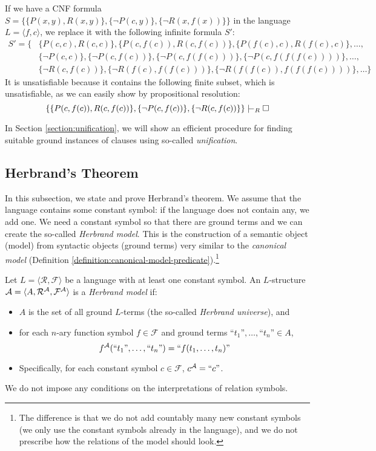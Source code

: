 \begin{example}
If we have a CNF formula $S=\{\{P(x,y),R(x,y)\},\{\neg P(c,y)\},\{\neg R(x,f(x))\}\}$ in the language $L=\langle f,c\rangle$, we replace it with the following infinite formula $S'$:
\begin{align*}
    S'=\{&\{P(c,c),R(c,c)\},\{P(c,f(c)),R(c,f(c))\},\{P(f(c),c),R(f(c),c)\},\dots,\\ 
    &\{\neg P(c,c)\}, \{\neg P(c,f(c))\},\{\neg P(c,f(f(c)))\},\{\neg P(c,f(f(f(c))))\}, \dots,\\
    &\{\neg R(c,f(c))\}, \{\neg R(f(c),f(f(c)))\},\{\neg R(f(f(c)),f(f(f(c))))\},\dots\}    
\end{align*}
It is unsatisfiable because it contains the following finite subset, which is unsatisfiable, as we can easily show by propositional resolution:
$$
\{\{P(c,f(c)),R(c,f(c))\},\{\neg P(c,f(c))\},\{\neg R(c,f(c))\}\}\proves_R\square
$$
\end{example}
In Section \ref{section:unification}, we will show an efficient procedure for finding suitable ground instances of clauses using so-called \emph{unification}.

\subsection{Herbrand's Theorem}

In this subsection, we state and prove Herbrand's theorem. We assume that the language contains some constant symbol: if the language does not contain any, we add one. We need a constant symbol so that there are ground terms and we can create the so-called \emph{Herbrand model}. This is the construction of a semantic object (model) from syntactic objects (ground terms) very similar to the \emph{canonical model} (Definition \ref{definition:canonical-model-predicate}).\footnote{The difference is that we do not add countably many new constant symbols (we only use the constant symbols already in the language), and we do not prescribe how the relations of the model should look.}

\begin{definition}
Let $L=\langle\mathcal R,\mathcal F\rangle$ be a language with at least one constant symbol. An $L$-structure $\mathcal{A}=\langle A,\mathcal R^{\mathcal{A}},\mathcal F^{\mathcal{A}}\rangle$ is a \emph{Herbrand model} if:
\begin{itemize}
    \item $A$ is the set of all ground $L$-terms (the so-called \emph{Herbrand universe}), and
    \item for each $n$-ary function symbol $f\in\mathcal F$ and ground terms $\text{``$t_1$''},\dots,\text{``$t_n$''}\in A$,
    $$
    f^{\mathcal{A}}(\text{``$t_1$''},\dots,\text{``$t_n$''})=\text{``$f(t_1,\dots,t_n)$''}
    $$
    \item Specifically, for each constant symbol $c\in\mathcal F$, $c^{\mathcal{A}}=\text{``$c$''}$.
\end{itemize}
We do not impose any conditions on the interpretations of relation symbols.
\end{definition}

